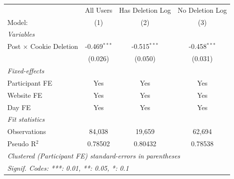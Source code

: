 \begin{tabular}{lccc}
   \tabularnewline \midrule \midrule
                                  & All Users      & Has Deletion Log & No Deletion Log \\   
   Model:                         & (1)            & (2)              & (3)\\  
   \midrule
   \emph{Variables}\\
   Post $\times$ Cookie Deletion  & -0.469$^{***}$ & -0.515$^{***}$   & -0.458$^{***}$\\   
                                  & (0.026)        & (0.050)          & (0.031)\\   
   \midrule
   \emph{Fixed-effects}\\
   Participant FE                 & Yes            & Yes              & Yes\\  
   Website FE                     & Yes            & Yes              & Yes\\  
   Day FE                         & Yes            & Yes              & Yes\\  
   \midrule
   \emph{Fit statistics}\\
   Observations                   & 84,038         & 19,659           & 62,694\\  
   Pseudo R$^2$                   & 0.78502        & 0.80432          & 0.78538\\  
   \midrule \midrule
   \multicolumn{4}{l}{\emph{Clustered (Participant FE) standard-errors in parentheses}}\\
   \multicolumn{4}{l}{\emph{Signif. Codes: ***: 0.01, **: 0.05, *: 0.1}}\\
\end{tabular}
